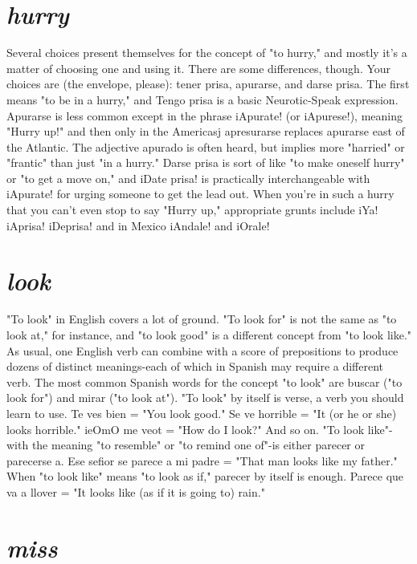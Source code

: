 \section{\emph{hurry}}

Several choices present themselves for the concept of "to
hurry," and mostly it's a matter of choosing one and using it. There are
some differences, though. Your choices are (the envelope, please): tener
prisa, apurarse, and darse prisa. The first means "to be in a hurry,"
and Tengo prisa is a basic Neurotic-Speak expression. Apurarse is less
common except in the phrase iApurate! (or iApurese!), meaning "Hurry
up!" and then only in the Americasj apresurarse replaces apurarse east
of the Atlantic. The adjective apurado is often heard, but implies more
"harried" or "frantic" than just "in a hurry." Darse prisa is sort of like
"to make oneself hurry" or "to get a move on," and iDate prisa! is
practically interchangeable with iApurate! for urging someone to get
the lead out. When you're in such a hurry that you can't even stop to
say "Hurry up," appropriate grunts include iYa! iAprisa! iDeprisa! and
in Mexico iAndale! and iOrale!

\section{\emph{look}}

"To look" in English covers a lot of ground. "To look for" is
not the same as "to look at," for instance, and "to look good" is a different concept from "to look like." As usual, one English verb can
combine with a score of prepositions to produce dozens of distinct
meanings-each of which in Spanish may require a different verb. The
most common Spanish words for the concept "to look" are buscar ("to
look for") and mirar ("to look at").
"To look" by itself is verse, a verb you should learn to use. Te
ves bien = "You look good." Se ve horrible = "It (or he or she) looks
horrible." ieOmO me veot = "How do I look?" And so on.
"To look like"-with the meaning "to resemble" or "to remind one of"-is either parecer or parecerse a. Ese sefior se parece a
mi padre = "That man looks like my father." When "to look like"
means "to look as if," parecer by itself is enough. Parece que va a
llover = "It looks like (as if it is going to) rain."

\section{\emph{miss}}

